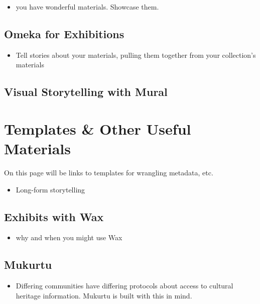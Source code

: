 \documentclass[
]{book}
\providecommand{\tightlist}{%
  \setlength{\itemsep}{0pt}\setlength{\parskip}{0pt}}
\begin{document}
\begin{itemize}
\tightlist
\item
  you have wonderful materials. Showcase them.
\end{itemize}

\hypertarget{omeka}{%
\section{Omeka for Exhibitions}\label{omeka}}

\begin{itemize}
\tightlist
\item
  Tell stories about your materials, pulling them together from your collection's materials
\end{itemize}

\hypertarget{mural}{%
\section{Visual Storytelling with Mural}\label{mural}}

\hypertarget{templates}{%
\chapter{Templates \& Other Useful Materials}\label{templates}}

On this page will be links to templates for wrangling metadata, etc.

\begin{itemize}
\tightlist
\item
  Long-form storytelling
\end{itemize}

\hypertarget{wax}{%
\section{Exhibits with Wax}\label{wax}}

\begin{itemize}
\tightlist
\item
  why and when you might use Wax
\end{itemize}

\hypertarget{mukurtu}{%
\section{Mukurtu}\label{mukurtu}}

\begin{itemize}
\tightlist
\item
  Differing communities have differing protocols about access to cultural heritage information. Mukurtu is built with this in mind.
\end{itemize}
\end{document}
